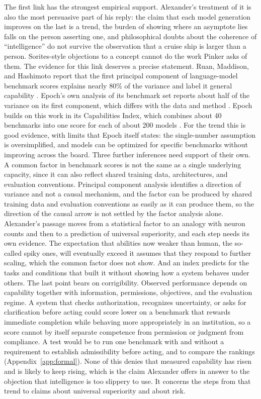 \documentclass[11pt]{article}
\begin{document}
The first link has the strongest empirical support. Alexander's treatment of it is also the most persuasive part of his reply: the claim that each model generation improves on the last is a trend, the burden of showing where an asymptote lies falls on the person asserting one, and philosophical doubts about the coherence of ``intelligence'' do not survive the observation that a cruise ship is larger than a person. Sorites-style objections to a concept cannot do the work Pinker asks of them. The evidence for this link deserves a precise statement. Ruan, Maddison, and Hashimoto report that the first principal component of language-model benchmark scores explains nearly 80\% of the variance and label it general capability \cite{ruan2024}. Epoch's own analysis of its benchmark set reports about half of the variance on its first component, which differs with the data and method \cite{epochfactor2025}. Epoch builds on this work in its Capabilities Index, which combines about 40 benchmarks into one score for each of about 200 models \cite{epoch2025}. For the trend this is good evidence, with limits that Epoch itself states: the single-number assumption is oversimplified, and models can be optimized for specific benchmarks without improving across the board. Three further inferences need support of their own. A common factor in benchmark scores is not the same as a single underlying capacity, since it can also reflect shared training data, architectures, and evaluation conventions. Principal component analysis identifies a direction of variance and not a causal mechanism, and the factor can be produced by shared training data and evaluation conventions as easily as it can produce them, so the direction of the causal arrow is not settled by the factor analysis alone. Alexander's passage moves from a statistical factor to an analogy with neuron counts and then to a prediction of universal superiority, and each step needs its own evidence. The expectation that abilities now weaker than human, the so-called spiky ones, will eventually exceed it assumes that they respond to further scaling, which the common factor does not show. And an index predicts for the tasks and conditions that built it without showing how a system behaves under others. The last point bears on corrigibility. Observed performance depends on capability together with information, permissions, objectives, and the evaluation regime. A system that checks authorization, recognizes uncertainty, or asks for clarification before acting could score lower on a benchmark that rewards immediate completion while behaving more appropriately in an institution, so a score cannot by itself separate competence from permission or judgment from compliance. A test would be to run one benchmark with and without a requirement to establish admissibility before acting, and to compare the rankings (Appendix~\ref{app:formal}). None of this denies that measured capability has risen and is likely to keep rising, which is the claim Alexander offers in answer to the objection that intelligence is too slippery to use. It concerns the steps from that trend to claims about universal superiority and about risk.
\end{document}
